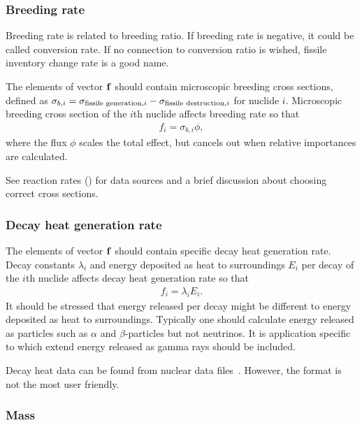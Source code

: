 \subsubsection*{Breeding rate}

Breeding rate is related to breeding ratio. If breeding rate is negative, it could be called conversion rate. If no connection to conversion ratio is wished, fissile inventory change rate is a good name.

The elements of vector $\mathbf{f}$ should contain microscopic breeding cross sections, defined as $\sigma_{b,i}=\sigma_{\textnormal{fissile generation},i}-\sigma_{\textnormal{fissile destruction},i}$ for nuclide $i$. Microscopic breeding cross section of the $i$th nuclide affects breeding rate so that
%
\begin{gather}
f_i = \sigma_{b,i}\phi,
\end{gather}
%
where the flux $\phi$ scales the total effect, but cancels out when relative importances are calculated.

See reaction rates () for data sources and a brief discussion about choosing correct cross sections.

\subsubsection*{Decay heat generation rate}

The elements of vector $\mathbf{f}$ should contain specific decay heat generation rate. Decay constants $\lambda_i$ and energy deposited as heat to surroundings $E_i$ per decay of the $i$th nuclide affects decay heat generation rate so that
%
\begin{gather}
f_i = \lambda_iE_i.
\end{gather}
%
It should be stressed that energy released per decay might be different to energy deposited as heat to surroundings. Typically one should calculate energy released as particles such as $\alpha$ and $\beta$-particles but not neutrinos. It is application specific to which extend energy released as gamma rays should be included.

Decay heat data can be found from nuclear data files~\cite{jendl,jeff,cendl,brond,endf}. However, the format is not the most user friendly.

\subsubsection*{Mass}

